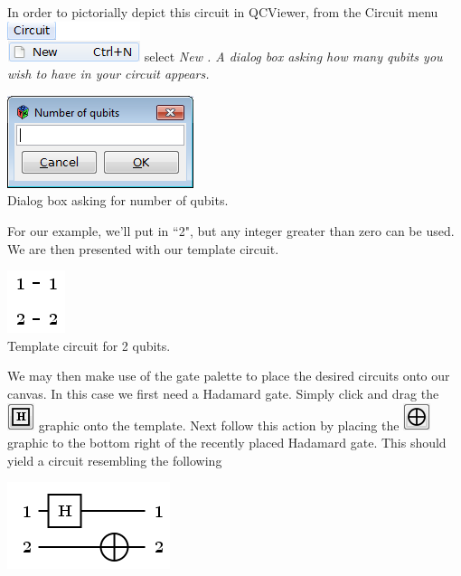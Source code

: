 \documentclass[10pt]{article}
\theoremstyle{definition}
\begin{document}
In order to pictorially depict this circuit in QCViewer, from the Circuit menu \includegraphics{Figures/CreateCircuit/New.png} select \em New \em. A dialog box asking how many qubits you wish to have in your circuit appears. 

\begin{center}
\includegraphics{Figures/CreateCircuit/NumberOfQubits.png}\\
Dialog box asking for number of qubits.
\end{center}

For our example, we'll put in ``2", but any integer greater than zero can be used. We are then presented with our template circuit.

\begin{center}
\includegraphics[scale=.7]{Figures/CreateCircuit/TemplateCircuit}\\
Template circuit for 2 qubits.
\end{center}

We may then make use of the gate palette to place the desired circuits onto our canvas. In this case we first need a Hadamard gate. Simply click and drag the \includegraphics{Figures/Gates/Hadamard.png} graphic onto the template. Next follow this action by placing the \includegraphics{Figures/Gates/Mod2.png} graphic to the bottom right of the recently placed Hadamard gate. This should yield a circuit resembling the following

\begin{center}
\includegraphics[scale=.7]{Figures/CreateCircuit/EPRCircuit2}
\end{center}
\end{document}
